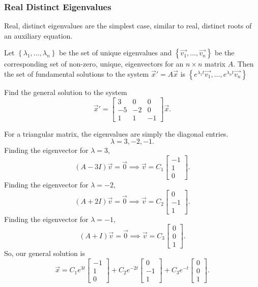 \subsubsection{Real Distinct Eigenvalues}
\noindent
Real, distinct eigenvalues are the simplest case, similar to real, distinct roots of an auxiliary equation.
\begin{theorem}
	Let $\left\{\lambda_1, \ldots, \lambda_n\right\}$ be the set of unique eigenvalues and $\left\{\vec{v_1}, \ldots, \vec{v_n}\right\}$ be the corresponding set of non-zero, unique, eigenvectors for an $n \times n$ matrix $A$. Then the set of fundamental solutions to the system $\vec{x}' = A\vec{x}$ is $\left\{e^{\lambda_1 t}\vec{v_1}, \ldots, e^{\lambda_n t}\vec{v_n} \right\}$
\end{theorem}

\begin{example}
	Find the general solution to the system
	\begin{equation*}
		\vec{x}' = \begin{bmatrix}
			3 & 0 & 0 \\
			-5 & -2 & 0 \\
			1 & 1 & -1
		\end{bmatrix} \vec{x}.
	\end{equation*}
\end{example}
\noindent
For a triangular matrix, the eigenvalues are simply the diagonal entries.
\begin{equation*}
	\lambda = 3, -2, -1.
\end{equation*}
Finding the eigenvector for $\lambda = 3$,
\begin{equation*}
	(A - 3I)\vec{v} = \vec{0} \implies \vec{v} = C_1\begin{bmatrix}
		-1 \\
		1 \\
		0
	\end{bmatrix}.
\end{equation*}
Finding the eigenvector for $\lambda = -2$,
\begin{equation*}
	(A + 2I)\vec{v} = \vec{0} \implies \vec{v} = C_2\begin{bmatrix}
		0 \\
		-1 \\
		1
	\end{bmatrix}.
\end{equation*}
Finding the eigenvector for $\lambda = -1$,
\begin{equation*}
	(A + I)\vec{v} = \vec{0} \implies \vec{v} = C_3\begin{bmatrix}
		0 \\
		0 \\
		1
	\end{bmatrix}.
\end{equation*}
So, our general solution is
\begin{equation*}
	\vec{x} = C_1e^{3t}\begin{bmatrix}
		-1 \\
		1 \\
		0
	\end{bmatrix} + C_2e^{-2t}\begin{bmatrix}
		0 \\
		-1 \\
		1
	\end{bmatrix} + C_3e^{-t}\begin{bmatrix}
		0 \\
		0 \\
		1
	\end{bmatrix}.
\end{equation*}